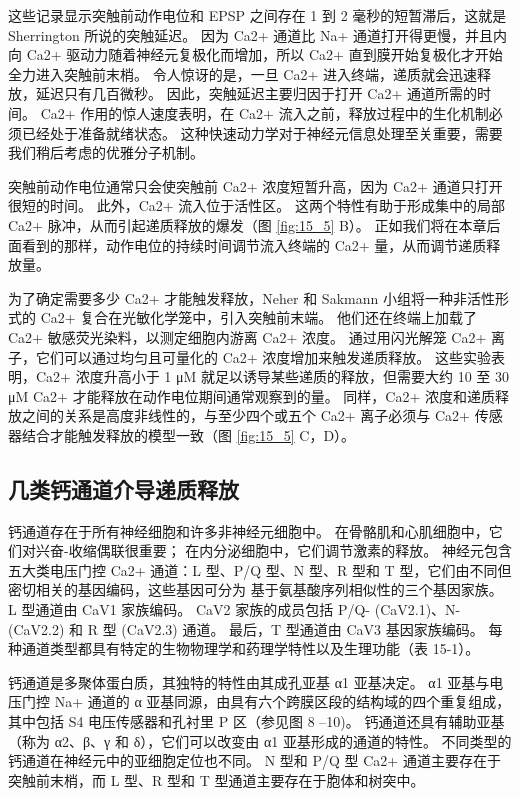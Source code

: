 这些记录显示突触前动作电位和 EPSP 之间存在 1 到 2 毫秒的短暂滞后，这就是 Sherrington 所说的突触延迟。 
因为 Ca2+ 通道比 Na+ 通道打开得更慢，并且内向 Ca2+ 驱动力随着神经元复极化而增加，所以 Ca2+ 直到膜开始复极化才开始全力进入突触前末梢。 
令人惊讶的是，一旦 Ca2+ 进入终端，递质就会迅速释放，延迟只有几百微秒。 
因此，突触延迟主要归因于打开 Ca2+ 通道所需的时间。 
Ca2+ 作用的惊人速度表明，在 Ca2+ 流入之前，释放过程中的生化机制必须已经处于准备就绪状态。 
这种快速动力学对于神经元信息处理至关重要，需要我们稍后考虑的优雅分子机制。


突触前动作电位通常只会使突触前 Ca2+ 浓度短暂升高，因为 Ca2+ 通道只打开很短的时间。 
此外，Ca2+ 流入位于活性区。 这两个特性有助于形成集中的局部 Ca2+ 脉冲，从而引起递质释放的爆发（图 \ref{fig:15_5} B）。 
正如我们将在本章后面看到的那样，动作电位的持续时间调节流入终端的 Ca2+ 量，从而调节递质释放量。


为了确定需要多少 Ca2+ 才能触发释放，Neher 和 Sakmann 小组将一种非活性形式的 Ca2+ 复合在光敏化学笼中，引入突触前末端。
他们还在终端上加载了 Ca2+ 敏感荧光染料，以测定细胞内游离 Ca2+ 浓度。 
通过用闪光解笼 Ca2+ 离子，它们可以通过均匀且可量化的 Ca2+ 浓度增加来触发递质释放。 
这些实验表明，Ca2+ 浓度升高小于 1 μM 就足以诱导某些递质的释放，但需要大约 10 至 30 μM Ca2+ 才能释放在动作电位期间通常观察到的量。 
同样，Ca2+ 浓度和递质释放之间的关系是高度非线性的，与至少四个或五个 Ca2+ 离子必须与 Ca2+ 传感器结合才能触发释放的模型一致（图 \ref{fig:15_5} C，D）。



\subsection{几类钙通道介导递质释放}

钙通道存在于所有神经细胞和许多非神经元细胞中。 
在骨骼肌和心肌细胞中，它们对兴奋-收缩偶联很重要； 在内分泌细胞中，它们调节激素的释放。 
神经元包含五大类电压门控 Ca2+ 通道：L 型、P/Q 型、N 型、R 型和 T 型，它们由不同但密切相关的基因编码，这些基因可分为 基于氨基酸序列相似性的三个基因家族。 
L 型通道由 CaV1 家族编码。 
CaV2 家族的成员包括 P/Q- (CaV2.1)、N- (CaV2.2) 和 R 型 (CaV2.3) 通道。 
最后，T 型通道由 CaV3 基因家族编码。 
每种通道类型都具有特定的生物物理学和药理学特性以及生理功能（表 15-1）。


钙通道是多聚体蛋白质，其独特的特性由其成孔亚基 α1 亚基决定。 
α1 亚基与电压门控 Na+ 通道的 α 亚基同源，由具有六个跨膜区段的结构域的四个重复组成，其中包括 S4 电压传感器和孔衬里 P 区（参见图 8 –10)。
钙通道还具有辅助亚基（称为 α2、β、γ 和 δ），它们可以改变由 α1 亚基形成的通道的特性。 
不同类型的钙通道在神经元中的亚细胞定位也不同。 
N 型和 P/Q 型 Ca2+ 通道主要存在于突触前末梢，而 L 型、R 型和 T 型通道主要存在于胞体和树突中。


